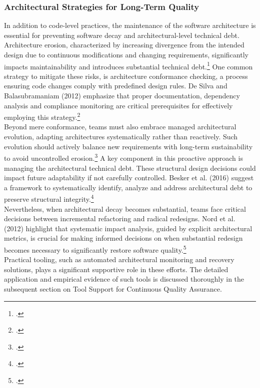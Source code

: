 \subsubsection{Architectural Strategies for Long-Term Quality}
In addition to code-level practices, the maintenance of the software architecture is essential for preventing software decay and architectural-level technical debt. 
Architecture erosion, characterized by increasing divergence from the intended design due to continuous modifications and changing requirements,
significantly impacts maintainability and introduces substantial technical debt.\footcite[1]{desilvaControllingSoftwareArchitecture2012}
One common strategy to mitigate these risks,  is architecture conformance checking, a process ensuring code changes comply with predefined design rules.
De Silva and Balasubramaniam (2012) emphasize that proper documentation, dependency analysis and compliance monitoring are critical prerequisites for
effectively employing this strategy.\footcite[135]{desilvaControllingSoftwareArchitecture2012}\\
Beyond mere conformance, teams must also embrace managed architectural evolution, adapting architectures systematically rather than reactively. Such evolution
should actively balance new requirements with long-term sustainability to avoid uncontrolled erosion.\footcite[34]{liUnderstandingSoftwareArchitecture2022}
A key component in this proactive approach is managing the architectural technical debt. These structural design decisions could impact future adaptability if not
carefully controlled. Besker et al. (2016) suggest a framework to systematically identify, analyze and address architectural debt to preserve structural integrity.\footcite[11]{beskerManagingArchitecturalTechnical2018}\\
Nevertheless, when architectural decay becomes substantial, teams face critical decisions between incremental refactoring and radical redesigns.
Nord et al. (2012) highlight that systematic impact analysis, guided by explicit architectural metrics, is crucial for making informed decisions on when substantial 
redesign becomes necessary to significantly restore software quality.\footcite[99]{nordSearchMetricManaging2012}\\
Practical tooling, such as automated architectural monitoring and recovery solutions, plays a significant supportive role in these efforts. 
The detailed application and empirical evidence of such tools is discussed thoroughly in the subsequent section on Tool Support for Continuous Quality Assurance.\\

